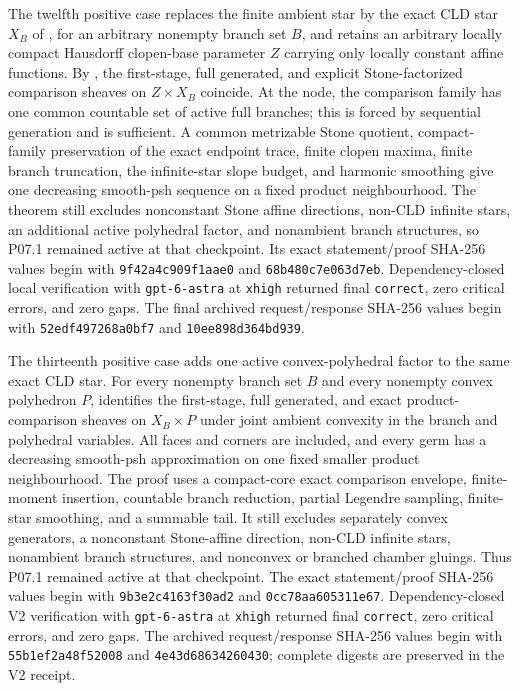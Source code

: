 The twelfth positive case replaces the finite ambient star by the exact CLD
star \(X_B\) of \cite[\S6.7.3]{CLD25}, for an arbitrary nonempty branch set
\(B\), and retains an arbitrary locally compact Hausdorff clopen-base
parameter \(Z\) carrying only locally constant affine functions.  By
, the first-stage, full
generated, and explicit Stone-factorized comparison sheaves on
\(Z\times X_B\) coincide.  At the node, the comparison family has one
common countable set of active full branches; this is forced by sequential
generation and is sufficient.  A common metrizable Stone quotient,
compact-family preservation of the exact endpoint trace, finite clopen
maxima, finite branch truncation, the infinite-star slope budget, and
harmonic smoothing give one decreasing smooth-psh sequence on a fixed
product neighbourhood.  The theorem still excludes nonconstant Stone
affine directions, non-CLD infinite stars, an additional active polyhedral
factor, and nonambient branch structures, so P07.1 remained active at that checkpoint.  Its
exact statement/proof SHA-256 values begin with
\texttt{9f42a4c909f1aae0} and \texttt{68b480c7e063d7eb}.
Dependency-closed local verification with \texttt{gpt-6-astra} at
\texttt{xhigh} returned final \texttt{correct}, zero critical errors, and
zero gaps.  The final archived request/response SHA-256 values begin with
\texttt{52edf497268a0bf7} and \texttt{10ee898d364bd939}.

The thirteenth positive case adds one active convex-polyhedral factor to the
same exact CLD star.  For every nonempty branch set \(B\) and every nonempty
convex polyhedron \(P\),
 identifies the first-stage,
full generated, and exact product-comparison sheaves on \(X_B\times P\)
under joint ambient convexity in the branch and polyhedral variables.  All
faces and corners are included, and every germ has a decreasing smooth-psh
approximation on one fixed smaller product neighbourhood.  The proof uses a
compact-core exact comparison envelope, finite-moment insertion, countable
branch reduction, partial Legendre sampling, finite-star smoothing, and a
summable tail.  It still excludes separately convex generators, a
nonconstant Stone-affine direction, non-CLD infinite stars, nonambient
branch structures, and nonconvex or branched chamber gluings.  Thus P07.1 remained active at that checkpoint.  The exact statement/proof SHA-256 values begin with
\texttt{9b3e2c4163f30ad2} and \texttt{0cc78aa605311e67}.
Dependency-closed V2 verification with \texttt{gpt-6-astra} at
\texttt{xhigh} returned final \texttt{correct}, zero critical errors, and
zero gaps.  The archived request/response SHA-256 values begin with
\texttt{55b1ef2a48f52008} and \texttt{4e43d68634260430}; complete digests
are preserved in the V2 receipt.

